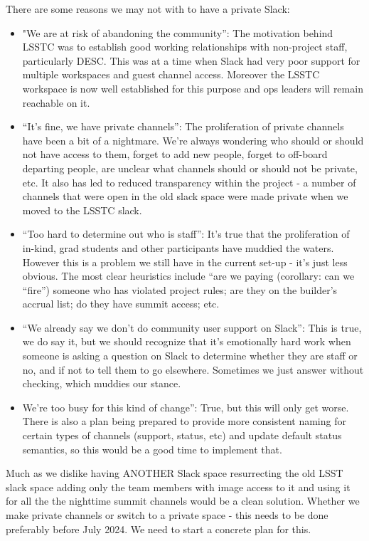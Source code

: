 There are some reasons we may not with to have a private Slack:

\begin{itemize}
\item "We are at risk of abandoning the community”: The motivation behind LSSTC was to establish good working relationships with non-project staff, particularly DESC. This was at a time when Slack had very poor support for multiple workspaces and guest channel access. Moreover the LSSTC workspace is now well established for this purpose and ops leaders will remain reachable on it.
\item  “It’s fine, we have private channels”: The proliferation of private channels have been a bit of a nightmare. We’re always wondering who should or should not have access to them, forget to add new people, forget to off-board departing people, are unclear what channels  should or should not be private, etc. It also has led to reduced transparency within the project - a number of channels that were open in the old slack space were made private when we moved to the LSSTC slack.
\item  “Too hard to determine out who is staff”: It’s true that the proliferation of in-kind, grad students and other participants have muddied the waters. However this is a problem we still have in the current set-up -  it’s just less obvious. The most clear heuristics include “are we paying (corollary: can we “fire”) someone who has violated project rules; are they on the builder’s accrual list; do they have summit access; etc.
\item  “We already say we don’t do community user support on Slack”: This is true, we do say it, but we should recognize that it’s emotionally hard work when someone is asking a question on Slack to determine whether they are staff or no, and if not to tell them to go elsewhere. Sometimes we just answer without checking, which muddies our stance.
\item  We’re too busy for this kind of change”: True, but this will only get worse. There is also a plan being prepared to provide more consistent naming for certain types of channels (support, status, etc) and update default status semantics,  so this would be a good time to implement that.
\end{itemize}


Much as we dislike having ANOTHER Slack space resurrecting the old LSST slack space adding only the team members with image access to it and using it for all the the nighttime summit channels would be a clean solution.
Whether we make private channels or switch to a private space - this needs to be done preferably before July 2024.
We need to start a concrete plan for this.

